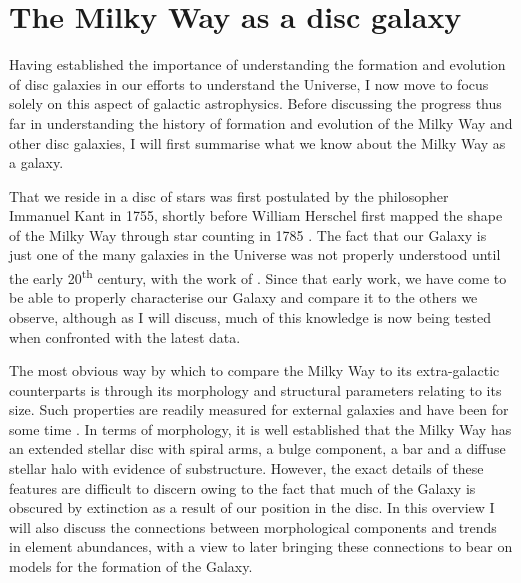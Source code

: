 \section{The Milky Way as a disc galaxy}


Having established the importance of understanding the formation and evolution of disc galaxies in our efforts to understand the Universe, I now move to focus solely on this aspect of galactic astrophysics. Before discussing the progress thus far in understanding the history of formation and evolution of the Milky Way and other disc galaxies, I will first summarise what we know about the Milky Way as a galaxy. 

That we reside in a disc of stars was first postulated by the philosopher Immanuel Kant in 1755, shortly before William Herschel first mapped the shape of the Milky Way through star counting in 1785 \citep{Herschel01011785}. The fact that our Galaxy is just one of the many galaxies in the Universe was not properly understood until the early 20\textsuperscript{th} century, with the work of \citet{1929ApJ....69..103H}. Since that early work, we have come to be able to properly characterise our Galaxy and compare it to the others we observe, although as I will discuss, much of this knowledge is now being tested when confronted with the latest data.

The most obvious way by which to compare the Milky Way to its extra-galactic counterparts is through its morphology and structural parameters relating to its size. Such properties are readily measured for external galaxies and have been for some time \citep[e.g.][]{1959HDP....53..311D}. In terms of morphology, it is well established that the Milky Way has an extended stellar disc with spiral arms, a bulge component, a bar and a diffuse stellar halo with evidence of substructure. However, the exact details of these features are difficult to discern owing to the fact that much of the Galaxy is obscured by extinction as a result of our position in the disc. In this overview I will also discuss the connections between morphological components and trends in element abundances, with a view to later bringing these connections to bear on models for the formation of the Galaxy.

